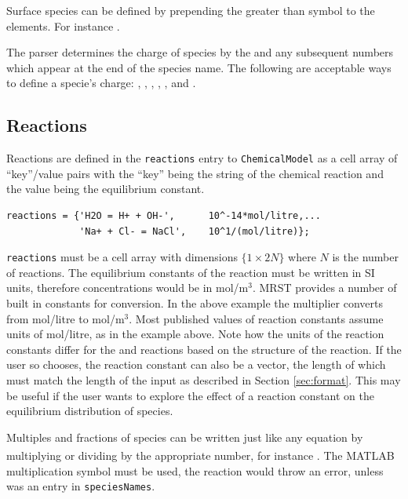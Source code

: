 \documentclass{article}
\begin{document}
Surface species can be defined by prepending the greater than symbol \mcode{>} to the elements. For instance . 

The parser determines the charge of species by the  and any subsequent numbers which appear at the end of the species name. The following are acceptable ways to define a specie's charge: , , , , , and .

\subsection{Reactions}

Reactions are defined in the \verb|reactions| entry to \verb|ChemicalModel| as a cell array of ``key''/value pairs with the ``key'' being the string of the chemical reaction and the value being the equilibrium constant. 

\begin{lstlisting}
reactions = {'H2O = H+ + OH-',      10^-14*mol/litre,...
             'Na+ + Cl- = NaCl',    10^1/(mol/litre)};
\end{lstlisting}
\verb|reactions| must be a cell array with dimensions $\{1 \times 2N\}$ where $N$ is the number of reactions. The equilibrium constants of the reaction must be written in SI units, therefore concentrations would be in mol/m$^3$. MRST provides a number of built in constants for conversion. In the above example the multiplier  converts from mol/litre to mol/m$^3$. Most published values of reaction constants assume units of mol/litre, as in the example above. Note how the units of the reaction constants differ for the  and  reactions based on the structure of the reaction. If the user so chooses, the reaction constant can also be a vector, the length of which must match the length of the input as described in Section \ref{sec:format}. This may be useful if the user wants to explore the effect of a reaction constant on the equilibrium distribution of species.

Multiples and fractions of species can be written just like any equation by multiplying or dividing by the appropriate number, for instance . The MATLAB\textsuperscript{\textregistered} multiplication symbol \mcode{*} must be used, the reaction  would throw an error, unless  was an entry in \verb|speciesNames|.
\end{document}
